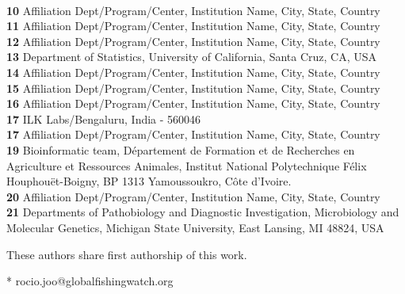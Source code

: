 \documentclass[10pt,letterpaper]{article}
\begin{document}
\begin{flushleft}
\\
\textbf{10} Affiliation Dept/Program/Center, Institution Name, City, State, Country
\\
\textbf{11} Affiliation Dept/Program/Center, Institution Name, City, State, Country
\\
\textbf{12} Affiliation Dept/Program/Center, Institution Name, City, State, Country
\\
\textbf{13} Department of Statistics, University of California, Santa Cruz, CA, USA
\\
\textbf{14} Affiliation Dept/Program/Center, Institution Name, City, State, Country
\\
\textbf{15} Affiliation Dept/Program/Center, Institution Name, City, State, Country
\\
\textbf{16} Affiliation Dept/Program/Center, Institution Name, City, State, Country
\\
\textbf{17} ILK Labs/Bengaluru, India - 560046
\\
\textbf{17} Affiliation Dept/Program/Center, Institution Name, City, State, Country
\\
\textbf{19} Bioinformatic team, Département de Formation et de Recherches en Agriculture et Ressources Animales, Institut National Polytechnique Félix Houphouët-Boigny, BP 1313 Yamoussoukro, Côte d’Ivoire.
\\
\textbf{20} Affiliation Dept/Program/Center, Institution Name, City, State, Country
\\
\textbf{21} Departments of Pathobiology and Diagnostic Investigation, Microbiology and Molecular Genetics, Michigan State University, East Lansing, MI 48824, USA
\\
\bigskip

% 
%
\Yinyang These authors share first authorship of this work.




* rocio.joo@globalfishingwatch.org

\end{flushleft}
\end{document}
